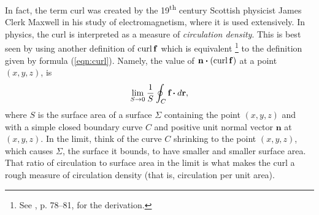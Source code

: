 In fact, the term curl was created by the 19\textsuperscript{th} century Scottish physicist James Clerk Maxwell in his study of electromagnetism, where it is used extensively. 
In physics, the curl is interpreted as a measure of
\emph{circulation density}. 
This is best seen by using another definition of $\mathop{\mathrm{curl}}\nolimits\mathbf{f}$ which is
equivalent%
\footnote{See \cite{sch}, p. 78--81, for the derivation.}  to the definition given by
formula (\ref{eqn:curl}). 
Namely, the value of $\mathbf{n} \bm{\cdot} (\mathop{\mathrm{curl}}\nolimits\mathbf{f})$ at a point $(x,y,z)$, is
\begin{equation}\label{eqn:curlalt}
\lim_{S \to 0} \frac{1}{S} \oint_{C} \textbf{f} \bm{\cdot} d\textbf{r},
\end{equation}
where $S$ is the surface area of a surface $\Sigma$ containing the point $(x,y,z)$ and with a simple closed boundary
curve $C$ and positive unit normal vector $\mathbf{n}$ at $(x,y,z)$. In the limit, think of the curve $C$ shrinking to
the point $(x,y,z)$, which causes $\Sigma$, the surface it bounds, to have smaller and smaller surface area. That ratio
of circulation to surface area in the limit is what makes the curl a rough measure of circulation density 
(that is, circulation per unit area).

